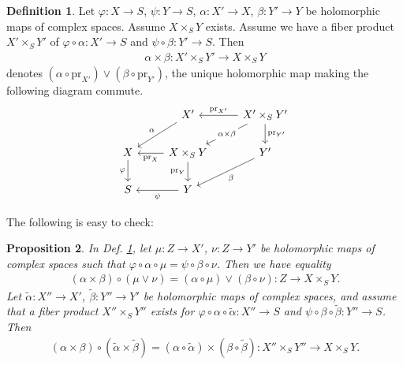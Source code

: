 \documentclass[12pt,b5paper,notitlepage]{report}
\theoremstyle{definition}
\newtheorem{df}{Definition}[section]
\theoremstyle{plain}
\newtheorem{pp}[df]{Proposition}
\newcommand{\wtd}{\widetilde}
\newcommand{\pr}{\mathrm {pr}}
\numberwithin{equation}{section}
\begin{document}
\begin{df}\label{lb28}
Let $\varphi:X\rightarrow S$, $\psi:Y\rightarrow S$, $\alpha:X'\rightarrow X$, $\beta:Y'\rightarrow Y$ be holomorphic maps of complex spaces. Assume $X\times_SY$ exists. Assume we have a fiber product $X'\times_SY'$ of $\varphi\circ\alpha:X'\rightarrow S$ and $\psi\circ\beta:Y'\rightarrow S$. Then 
\begin{align}
\alpha\times\beta:X'\times_S Y'\rightarrow X\times_SY
\end{align}
denotes $(\alpha\circ\pr_{X'})\vee(\beta\circ\pr_{Y'})$, the unique holomorphic map making the following diagram commute.
\begin{equation}
\begin{tikzcd}
                  &           X'     \arrow[ld,"\alpha"']                    & X'\times_SY' \arrow[ld, "\alpha\times\beta" description] \arrow[l, "\pr_{X'}"'] \arrow[d, "\pr_{Y'}"] \\
X \arrow[d, "\varphi"'] & X\times_SY \arrow[l, "\pr_X"] \arrow[d, "\pr_Y"'] &              Y' \arrow[ld,"\beta"]                                                 \\
S                 & Y \arrow[l, "\psi"]                  &                                                              
\end{tikzcd}
\end{equation}
\end{df}

The following is easy to check:
\begin{pp}\label{lb30}
In Def. \ref{lb28}, let $\mu:Z\rightarrow X'$, $\nu:Z\rightarrow Y'$ be holomorphic maps of complex spaces such that $\varphi\circ\alpha\circ\mu=\psi\circ\beta\circ\nu$. Then we have equality
\begin{align}
(\alpha\times\beta)\circ (\mu\vee\nu)=(\alpha\circ\mu)\vee(\beta\circ\nu):Z\rightarrow X\times_SY.
\end{align}
Let $\wtd\alpha:X''\rightarrow X'$, $\wtd\beta:Y''\rightarrow Y'$ be holomorphic maps of complex spaces, and assume that a fiber product $X''\times_SY''$ exists for $\varphi\circ\alpha\circ\wtd\alpha:X''\rightarrow S$ and $\psi\circ\beta\circ\wtd\beta:Y''\rightarrow S$. Then
\begin{align}
(\alpha\times\beta)\circ(\wtd\alpha\times\wtd\beta)=(\alpha\circ\wtd\alpha)\times(\beta\circ\wtd\beta):X''\times_SY''\rightarrow X\times_SY.
\end{align}
\end{pp}
\end{document}
